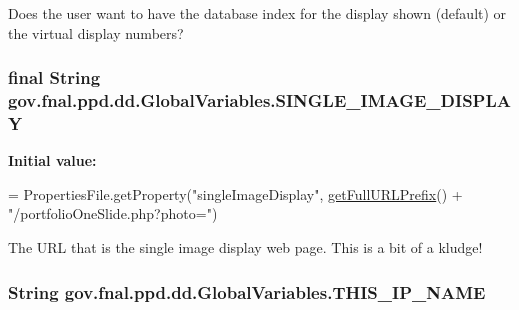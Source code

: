Does the user want to have the database index for the display shown (default) or the virtual display numbers? \hypertarget{classgov_1_1fnal_1_1ppd_1_1dd_1_1GlobalVariables_ab018dd06fadda0d1bc99e7de66894e84}{
\subsubsection[{S\-I\-N\-G\-L\-E\-\_\-\-I\-M\-A\-G\-E\-\_\-\-D\-I\-S\-P\-L\-A\-Y}]{\setlength{\rightskip}{0pt plus 5cm}final String gov.\-fnal.\-ppd.\-dd.\-Global\-Variables.\-S\-I\-N\-G\-L\-E\-\_\-\-I\-M\-A\-G\-E\-\_\-\-D\-I\-S\-P\-L\-A\-Y\hspace{0.3cm}{\ttfamily [static]}}}\label{classgov_1_1fnal_1_1ppd_1_1dd_1_1GlobalVariables_ab018dd06fadda0d1bc99e7de66894e84}
{\bfseries Initial value\-:}
\begin{DoxyCode}
= PropertiesFile.getProperty(\textcolor{stringliteral}{"singleImageDisplay"},
            \hyperlink{classgov_1_1fnal_1_1ppd_1_1dd_1_1GlobalVariables_ab7639ebfcc296b374593079a06026c65}{getFullURLPrefix}() + \textcolor{stringliteral}{"/portfolioOneSlide.php?photo="})
\end{DoxyCode}
The U\-R\-L that is the single image display web page. This is a bit of a kludge! \hypertarget{classgov_1_1fnal_1_1ppd_1_1dd_1_1GlobalVariables_a35adf140ccbaaf275e34d1539424828a}{
\subsubsection[{T\-H\-I\-S\-\_\-\-I\-P\-\_\-\-N\-A\-M\-E}]{\setlength{\rightskip}{0pt plus 5cm}String gov.\-fnal.\-ppd.\-dd.\-Global\-Variables.\-T\-H\-I\-S\-\_\-\-I\-P\-\_\-\-N\-A\-M\-E\hspace{0.3cm}{\ttfamily [static]}}}\label{classgov_1_1fnal_1_1ppd_1_1dd_1_1GlobalVariables_a35adf140ccbaaf275e34d1539424828a}
